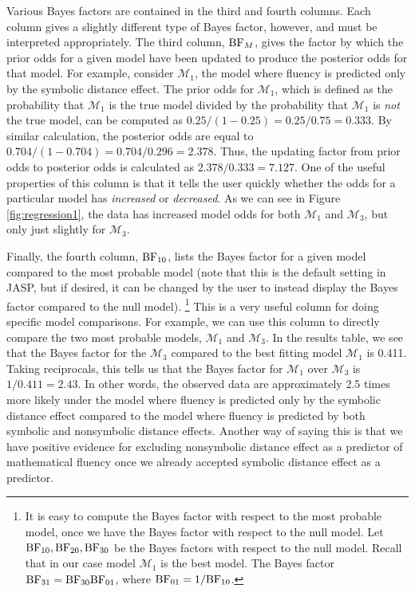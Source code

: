 \documentclass[english,,doc,floatsintext]{apa6}
\begin{document}
Various Bayes factors are contained in the third and fourth columns. Each column gives a slightly different type of Bayes factor, however, and must be interpreted appropriately. The third column, \(\textnormal{BF}_{M}\), gives the factor by which the prior odds for a given model have been updated to produce the posterior odds for that model. For example, consider \(\mathcal{M}_{1}\), the model where fluency is predicted only by the symbolic distance effect. The prior odds for \(\mathcal{M}_{1}\), which is defined as the probability that \(\mathcal{M}_{1}\) is the true model divided by the probability that \(\mathcal{M}_{1}\) is \emph{not} the true model, can be computed as \(0.25/(1-0.25) = 0.25/0.75 = 0.333\). By similar calculation, the posterior odds are equal to \(0.704/(1-0.704) = 0.704/0.296 = 2.378\). Thus, the updating factor from prior odds to posterior odds is calculated as \(2.378/0.333 = 7.127\). One of the useful properties of this column is that it tells the user quickly whether the odds for a particular model has \emph{increased} or \emph{decreased}. As we can see in Figure \ref{fig:regression1}, the data has increased model odds for both \(\mathcal{M}_{1}\) and \(\mathcal{M}_{3}\), but only just slightly for \(\mathcal{M}_{3}\).

Finally, the fourth column, \(\textnormal{BF}_{10}\), lists the Bayes factor for a given model compared to the most probable model (note that this is the default setting in JASP, but if desired, it can be changed by the user to instead display the Bayes factor compared to the null model).
\footnote{It is easy to compute the Bayes factor with respect to the most probable model, once we have the Bayes factor with respect to the null model. Let \( \textnormal{BF}_{10}, \textnormal{BF}_{20}, \textnormal{BF}_{30} \) be the Bayes factors with respect to the null model. Recall that in our case model \( \mathcal{M}_{1} \) is the best model. The Bayes factor \( \textnormal{BF}_{31} =\textnormal{BF}_{30} \textnormal{BF}_{01} \), where \( \textnormal{BF}_{01}= 1/\textnormal{BF}_{10} \).}
This is a very useful column for doing specific model comparisons. For example, we can use this column to directly compare the two most probable models, \(\mathcal{M}_{1}\) and \(\mathcal{M}_{3}\). In the results table, we see that the Bayes factor for the \(\mathcal{M}_{3}\) compared to the best fitting model \(\mathcal{M}_{1}\) is 0.411. Taking reciprocals, this tells us that the Bayes factor for \(\mathcal{M}_{1}\) over \(\mathcal{M}_{3}\) is \(1/0.411 = 2.43\). In other words, the observed data are approximately 2.5 times more likely under the model where fluency is predicted only by the symbolic distance effect compared to the model where fluency is predicted by both symbolic and nonsymbolic distance effects. Another way of saying this is that we have positive evidence for excluding nonsymbolic distance effect as a predictor of mathematical fluency once we already accepted symbolic distance effect as a predictor.
\end{document}
